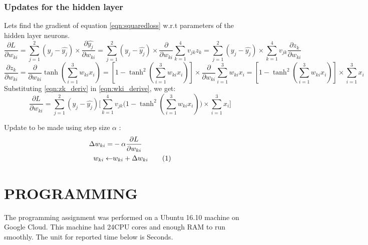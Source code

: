 \documentclass[letter,doc,notimes]{article}
\newcommand\numberthis{\addtocounter{equation}{1}\tag{\theequation}}
\begin{document}
\subsubsection{Updates for the hidden layer}
Lets find the gradient of equation \ref{eqn:squaredloss} w.r.t parameters of the hidden layer neurons.
\begin{equation}\label{eqn:wki_derive}
\frac{\partial L}{\partial w_{ki}} = \sum_{j=1}^{2}(y_j - \hat{y_j}) \times \frac{\partial \hat{y_j}}{\partial w_{ki}} = \sum_{j=1}^{2}(y_j - \hat{y_j}) \times \frac{\partial }{\partial w_{ki}} \sum_{k=1}^{4} v_{jk}z_k  = \sum_{j=1}^{2}(y_j - \hat{y_j}) \times \sum_{k=1}^{4} v_{jk}  \frac{\partial z_k}{\partial w_{ki}} 
\end{equation}
\begin{equation} \label{eqn:zk_deriv}
\frac{\partial z_k}{\partial w_{ki}} = \frac{\partial }{\partial w_{ki}}  \tanh(\sum_{i=1}^{3} w_{ki}x_i) = [ 1 - \tanh^2(\sum_{i=1}^{3} w_{ki}x_i)] \times  \frac{\partial }{\partial w_{ki}} \sum_{i=1}^{3} w_{ki}x_i = [ 1 - \tanh^2(\sum_{i=1}^{3} w_{ki}x_i)] \times   \sum_{i=1}^{3} x_i  
\end{equation}
Substituting \ref{eqn:zk_deriv} in \ref{eqn:wki_derive}, we get: 
\begin{equation}\label{eqn:wki_derive2}
\frac{\partial L}{\partial w_{ki}} = \sum_{j=1}^{2}(y_j - \hat{y_j}) \bigg[ \sum_{k=1}^{4} v_{jk} \big( 1 - \tanh^2(\sum_{i=1}^{3} w_{ki}x_i) \big)\times   \sum_{i=1}^{3} x_i  \bigg]
\end{equation}

Update to be made using step size $\alpha$ : 
\begin{align*}
\Delta w_{ki}  = & - \alpha \frac{\partial L}{\partial w_{ki}} \\
w_{ki} \leftarrow &  w_{ki}  + \Delta w_{ki} \numberthis
\end{align*}


\section{PROGRAMMING}

The programming assignment was performed on a Ubuntu 16.10 machine on Google Cloud. This machine had 24CPU cores and enough RAM to run smoothly.
The unit for reported  time below is Seconds.

\end{document}
